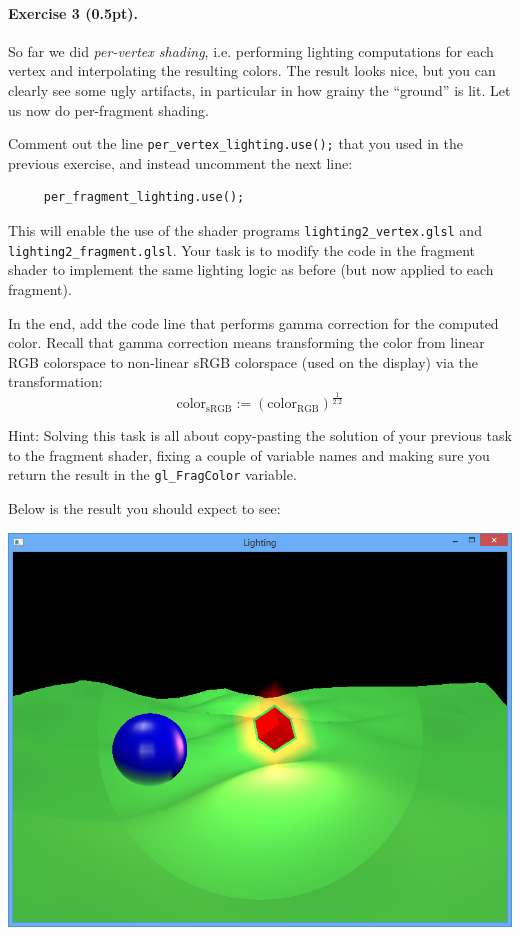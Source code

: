 \documentclass{article}
\newenvironment{exercise}[2]{\paragraph{Exercise #1 (#2pt).} }{
\medskip}
\begin{document}
\begin{exercise}{3}{0.5}
So far we did \emph{per-vertex shading}, i.e. performing lighting computations for each vertex and interpolating the resulting colors. The result looks nice, but you can clearly see some ugly artifacts, in particular in how grainy the ``ground'' is lit. Let us now do per-fragment shading.

\noindent
Comment out the line \verb#per_vertex_lighting.use();# that you used in the previous exercise, and instead uncomment the next line:
\begin{lstlisting}
	 per_fragment_lighting.use();     
\end{lstlisting}
This will enable the use of the shader programs \verb#lighting2_vertex.glsl# and \verb#lighting2_fragment.glsl#. Your task is to modify the code in the fragment shader to implement the same lighting logic as before (but now applied to each fragment). 

In the end, add the code line that performs gamma correction for the computed color. Recall that gamma correction means transforming the color from linear RGB colorspace to non-linear sRGB colorspace (used on the display) via the transformation:
$$
\text{color}_\text{sRGB} := \left(\text{color}_\text{RGB}\right)^\frac{1}{2.2}
$$

Hint: Solving this task is all about copy-pasting the solution of your previous task to the fragment shader, fixing a couple of variable names and making sure you return the result in the \verb#gl_FragColor# variable.
\end{exercise}

Below is the result you should expect to see:
\begin{center}
\includegraphics[width=1.0\textwidth]{lighting2.png}
\end{center}
\end{document}
